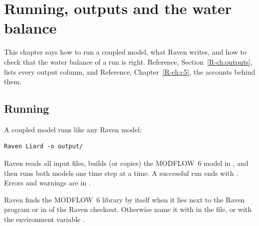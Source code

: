 \chapter{Running, outputs and the water balance}\label{uch:outputs}
This chapter says how to run a coupled model, what Raven writes, and how to check that the water balance of a run is
right. Reference, Section~\ref{R-ch:outputs}, lists every output column, and Reference, Chapter~\ref{R-ch:c5}, the
accounts behind them.

\section{Running}
A coupled model runs like any Raven model:
\begin{lstlisting}
Raven Liard -o output/
\end{lstlisting}
Raven reads all input files, builds (or copies) the MODFLOW~6 model in , and then runs both models one
time step at a time. A successful run ends with . Errors and warnings
are in .

Raven finds the MODFLOW~6 library by itself when it lies next to the Raven program or in  of the Raven
checkout. Otherwise name it with  in the  file, or with the environment variable
.

